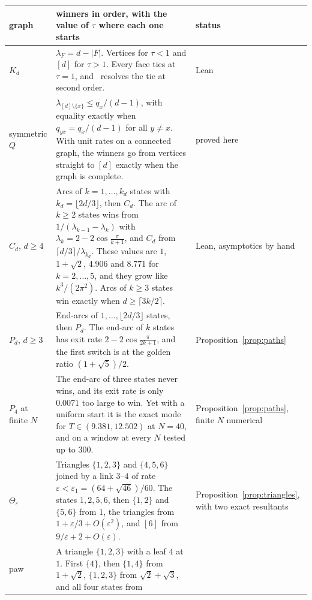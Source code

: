 \begin{table}[t]
\centering\small
\renewcommand{\arraystretch}{1.15}
\begin{tabular}{@{}>{\raggedright\arraybackslash}p{2.1cm}
>{\raggedright\arraybackslash}p{10.2cm}
>{\raggedright\arraybackslash}p{2.6cm}@{}}
\toprule
graph & winners in order, with the value of $\tau$ where each one starts &
status\\
\midrule
$K_d$ & $\lambda_F=d-\lvert F\rvert$. Vertices for $\tau<1$ and $[d]$ for
$\tau>1$. Every face ties at $\tau=1$, and~\cite{paperB} resolves the tie at
second order. & Lean\\
symmetric $Q$ & $\lambda_{[d]\setminus\{x\}}\le q_x/(d-1)$, with equality
exactly when $q_{yx}=q_x/(d-1)$ for all $y\ne x$. With unit rates on a
connected graph, the winners go from vertices straight to $[d]$ exactly when
the graph is complete. & proved here\\
$C_d$, $d\ge4$ & Arcs of $k=1,\dots,k_d$ states with $k_d=\lfloor2d/3\rfloor$,
then $C_d$. The arc of $k\ge2$ states wins from $1/(\lambda_{k-1}-\lambda_k)$
with $\lambda_k=2-2\cos\frac\pi{k+1}$, and $C_d$ from
$\lceil d/3\rceil/\lambda_{k_d}$. These values are $1$, $1+\sqrt2$, $4.906$ and
$8.771$ for $k=2,\dots,5$, and they grow like $k^3/(2\pi^2)$. Arcs of $k\ge3$
states win exactly when $d\ge\lceil3k/2\rceil$. & Lean, asymptotics by hand\\
$P_d$, $d\ge3$ & End-arcs of $1,\dots,\lfloor2d/3\rfloor$ states, then $P_d$.
The end-arc of $k$ states has exit rate $2-2\cos\frac\pi{2k+1}$, and the first
switch is at the golden ratio $(1+\sqrt5)/2$. &
Proposition~\ref{prop:paths}\\
$P_4$ at finite $N$ & The end-arc of three states never wins, and its exit rate is
only $0.0071$ too large to win. Yet with a uniform start it is the exact mode
for $T\in(9.381,12.502)$ at $N=40$, and on a window at every $N$ tested up to
$300$. & Proposition~\ref{prop:paths}, finite $N$ numerical\\
$\Theta_\varepsilon$ & Triangles $\{1,2,3\}$ and $\{4,5,6\}$ joined by a link
$3$--$4$ of rate $\varepsilon<\varepsilon_1=(64+\sqrt{46})/60$. The states
$1,2,5,6$, then $\{1,2\}$ and $\{5,6\}$ from $1$, the triangles from
$1+\varepsilon/3+O(\varepsilon^2)$, and $[6]$ from
$9/\varepsilon+2+O(\varepsilon)$. & Proposition~\ref{prop:triangles}, with two
exact resultants\\
paw & A triangle $\{1,2,3\}$ with a leaf $4$ at $1$. First $\{4\}$, then $\{1,4\}$
from $1+\sqrt2$, $\{1,2,3\}$ from $\sqrt2+\sqrt3$, and all four states from

\end{tabular}
\end{table}
